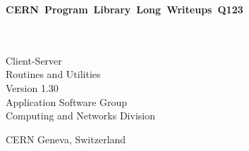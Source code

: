  
\begin{titlepage}
%
\notHTML{\vspace*{-23mm}}%
%
\HTML{\mbox{}}%
\hfill
{}\hbox{\Large\bf CERN Program Library Long Writeups Q123}
\hfill\mbox{}
\begin{center}
  \mbox{}\\[6mm]
  \mbox{}\\[2cm]
  {\LARGE Client-Server}\\[1cm]
  {\LARGE Routines and Utilities}\\[2cm]
  {\LARGE Version 1.30}\\[3cm]
  {\Large Application Software Group}\\[6mm]
  {\Large Computing and Networks Division}\\[2cm]
\end{center}
\notHTML{\vfill}%
\begin{center}\Large CERN Geneva, Switzerland\end{center}
%
\end{titlepage}

